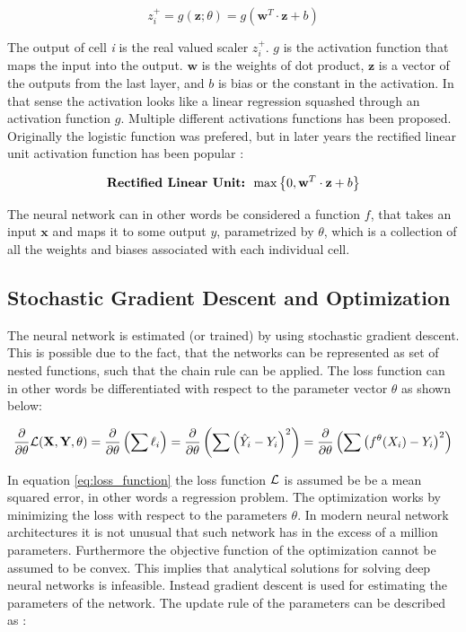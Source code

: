 \begin{equation}
    z_i^{+} = g(\textbf{z}; \theta) = g(\textbf{w}^T \cdot \textbf{z} + b)
\end{equation}

The output of cell \textit{i} is the real valued scaler $z_i^+$. $g$ is the activation function that maps the input into the output. $\textbf{w}$ is the weights of dot product, $\textbf{z}$ is a vector of the outputs from the last layer, and $b$ is bias or the constant in the activation. In that sense the activation looks like a linear regression squashed through an activation function $g$. Multiple different activations functions has been proposed. Originally the logistic function was prefered, but in later years the rectified linear unit activation function has been popular \parencite{goodfellow_deep_2016}:

\begin{equation}
    \textbf{Rectified Linear Unit: }  \max \left\{ 0, \textbf{w}^T \cdot \textbf{z} + b \right\}
\end{equation}

The neural network can in other words be considered a function $f$, that takes an input $\textbf{x}$ and maps it to some output $y$, parametrized by $\theta$, which is a collection of all the weights and biases associated with each individual cell.

\subsection{Stochastic Gradient Descent and Optimization}

The neural network is estimated (or trained) by using stochastic gradient descent. This is possible due to the fact, that the networks can be represented as set of nested functions, such that the chain rule can be applied. The loss function can in other words be differentiated with respect to the parameter vector $\theta$ as shown below:

\begin{equation}\label{eq:loss_function}
    \frac{\partial}{\partial\theta} \mathcal{L} (\textbf{X}, \textbf{Y}, \theta) = \frac{\partial}{\partial\theta} \left( \sum \ell_i \right) = \frac{\partial}{\partial\theta} \left( \sum \left( \hat{Y}_i  - Y_i \right)^2 \right) = \frac{\partial}{\partial\theta} \left( \sum \left( f^{\theta}(X_i)  - Y_i \right)^2 \right)
\end{equation}

In equation \eqref{eq:loss_function} the loss function $\mathcal{L}$ is assumed be be a mean squared error, in other words a regression problem. The optimization works by minimizing the loss with respect to the parameters $\theta$. In modern neural network architectures it is not unusual that such network has in the excess of a million parameters. Furthermore the objective function of the optimization cannot be assumed to be convex. This implies that analytical solutions for solving deep neural networks is infeasible. Instead gradient descent is used for estimating the parameters of the network. The update rule of the parameters can be described as \parencite{goodfellow_deep_2016}:

